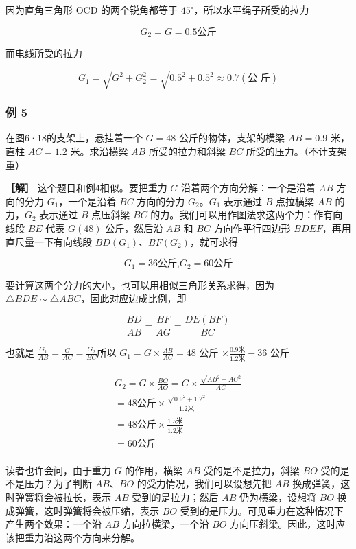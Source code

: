 因为直角三角形 OCD 的两个锐角都等于
\(45^{\circ}\)，所以水平绳子所受的拉力

\[
G _ {2} = G = 0.5 \text{公斤}
\]

而电线所受的拉力

\[
G _ {1} = \sqrt {G ^ {2} + G _ {2} ^ {2}} = \sqrt {0.5 ^ {2} + 0.5 ^ {2}} \approx 0.7 (\text{公 斤})
\]

\subsubsection{例 5}\label{ux4f8b-5-3}

在图6·18的支架上，悬挂着一个 \(G = 48\) 公斤的物体，支架的横梁
\(AB = 0.9\) 米，直柱 \(AC = 1.2\) 米。求沿横梁 \(AB\) 所受的拉力和斜梁
\(BC\) 所受的压力。（不计支架重）

\textbf{［解］} 这个题目和例4相似。要把重力 \(G\)
沿着两个方向分解：一个是沿着 \(AB\) 方向的分力 \(G_{1}\)，一个是沿着
\(BC\) 方向的分力 \(G_{2}\)。\(G_{1}\) 表示通过 \(B\) 点拉横梁 \(AB\)
的力，\(G_{2}\) 表示通过 \(B\) 点压斜梁 \(BC\)
的力。我们可以用作图法求这两个力：作有向线段 \(BE\) 代表 \(G(48)\)
公斤，然后沿 \(AB\) 和 \(BC\) 方向作平行四边形
\(BDEF\)，再用直尺量一下有向线段 \(BD(G_{1})\)、\(BF(G_{2})\)，就可求得

\[
G _ {1} = 36 \text{公斤,} G _ {2} = 60 \text{公斤}
\]

要计算这两个分力的大小，也可以用相似三角形关系求得，因为
\(\triangle BDE\sim \triangle ABC\)，因此对应边成比例，即

\[
\frac {B D}{A B} = \frac {B F}{A G} = \frac {D E (B F)}{B C}
\]

也就是 \(\frac{G_1}{AB} = \frac{G}{AC} = \frac{G_2}{BC}\)所以
\(G_{1} = G \times \frac{AB}{AC} = 48\) 公斤
\(\times \frac{0.9\text{米}}{1.2\text{米}} - 36\) 公斤

\[
\begin{array}{l} G _ {2} = G \times \frac {B O}{A O} = G \times \frac {\sqrt {A B ^ {2} + A C ^ {2}}}{A C} \\ = 48 \text{公斤} \times \frac {\sqrt {0.9 ^ {2} + 1.2 ^ {2}}}{1.2 \text{米}} \\ = 48 \text{公斤} \times \frac {1.5 \text{米}}{1.2 \text{米}} \\ = 60 \text{公斤} \\ \end{array}
\]

读者也许会问，由于重力 \(G\) 的作用，横梁 \(AB\) 受的是不是拉力，斜梁
\(BO\) 受的是不是压力？为了判断 \(AB\)、\(BO\)
的受力情况，我们可以设想先把 \(AB\) 换成弹簧，这时弹簧将会被拉长，表示
\(AB\) 受到的是拉力；然后 \(AB\) 仍为横梁，设想将 \(BO\)
换成弹簧，这时弹簧将会被压缩，表示 \(BO\)
受到的是压力。可见重力在这种情况下产生两个效果：一个沿 \(AB\)
方向拉横梁，一个沿 \(BO\)
方向压斜梁。因此，这时应该把重力沿这两个方向来分解。

